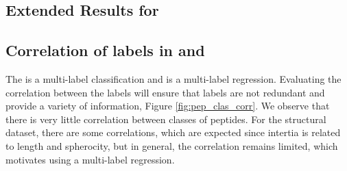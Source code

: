 \documentclass{article}
\begin{document}
\subsection{Extended Results for \pepstruct}
\label{app:extended_results}

\begin{table}[ht]
    \caption{Extended evaluation metrics for \pepstruct. The training and testing performance is quantified in terms of the Coefficient of Determination , in addition to MAE reported in Table~\ref{tab:experiments_peptides}.
    }
    \label{tab:pep_r2}
    \centering
\end{table}



\subsection{Correlation of labels in \pepfunc and \pepstruct}

The \pepfunc is a multi-label classification and \pepstruct is a multi-label regression. Evaluating the correlation between the labels will ensure that labels are not redundant and provide a variety of information, Figure \ref{fig:pep_clas_corr}. We observe that there is very little correlation between classes of peptides. For the structural dataset, there are some correlations, which are expected since intertia is related to length and spherocity, but in general, the correlation remains limited, which motivates using a multi-label regression.
\end{document}
